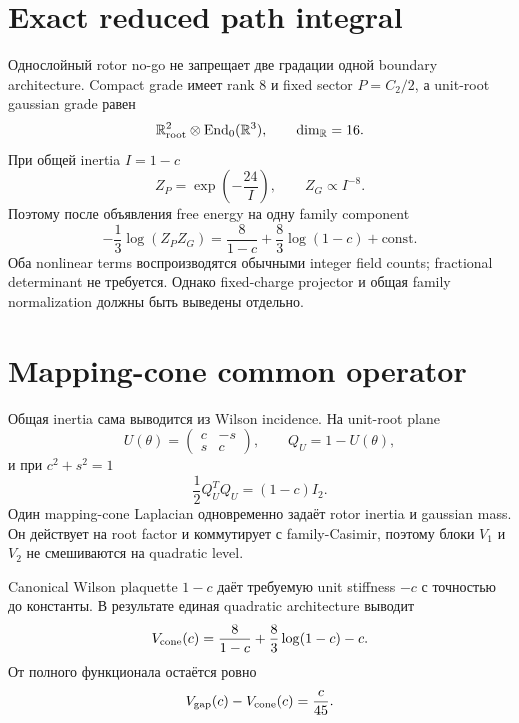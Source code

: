 \section{Exact reduced path integral}

Однослойный rotor no-go не запрещает две градации одной boundary
architecture. Compact grade имеет rank \(8\) и fixed sector \(P=C_2/2\), а
unit-root gaussian grade равен
\begin{equation}
 \mathbb R^2_{\rm root}\otimes\operatorname{End}_0(\mathbb R^3),
 \qquad \dim_{\mathbb R}=16.
\end{equation}
При общей inertia \(I=1-c\)
\begin{equation}
 Z_P=\exp\left(-\frac{24}{I}\right),
 \qquad
 Z_G\propto I^{-8}.
\end{equation}
Поэтому после объявления free energy на одну family component
\begin{equation}
 -\frac13\log(Z_PZ_G)
 =\frac8{1-c}+\frac83\log(1-c)+\text{const}.
\end{equation}
Оба nonlinear terms воспроизводятся обычными integer field counts;
fractional determinant не требуется. Однако fixed-charge projector и общая
family normalization должны быть выведены отдельно.

\section{Mapping-cone common operator}

Общая inertia сама выводится из Wilson incidence. На unit-root plane
\begin{equation}
 U(\theta)=
 \begin{pmatrix}c&-s\\s&c\end{pmatrix},
 \qquad Q_U=1-U(\theta),
\end{equation}
и при \(c^2+s^2=1\)
\begin{equation}
 \frac12Q_U^TQ_U=(1-c)I_2.
\end{equation}
Один mapping-cone Laplacian одновременно задаёт rotor inertia и gaussian
mass. Он действует на root factor и коммутирует с family-Casimir, поэтому
блоки \(V_1\) и \(V_2\) не смешиваются на quadratic level.

Canonical Wilson plaquette \(1-c\) даёт требуемую unit stiffness \(-c\) с
точностью до константы. В результате единая quadratic architecture выводит
\begin{equation}
 V_{\rm cone}(c)
 =\frac8{1-c}+\frac83\log(1-c)-c.
\end{equation}
От полного функционала остаётся ровно
\begin{equation}
 V_{\rm gap}(c)-V_{\rm cone}(c)=\frac{c}{45}.
\end{equation}


